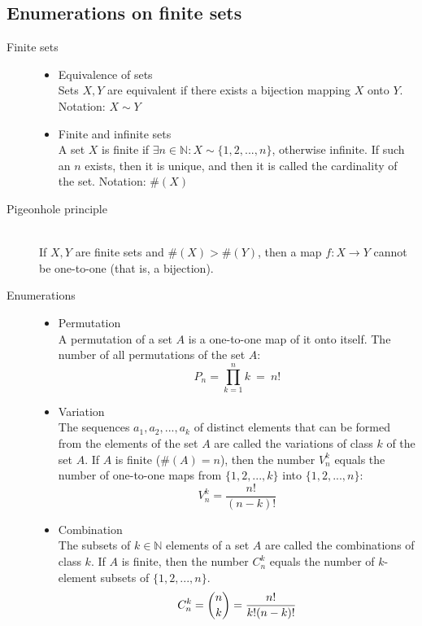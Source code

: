 \documentclass[margin=0px]{article}
\newcommand{\N}{\mathbb{N}}
\begin{document}
\subsection{Enumerations on finite sets}
\begin{description}
    \item[Finite sets] \hfill
        \begin{itemize}
            \item Equivalence of sets \\
                  Sets $X,Y$ are equivalent if there exists a bijection mapping $X$ onto $Y$.\\
                  Notation: $X \sim Y$
            \item Finite and infinite sets \\
                  A set $X$ is finite if $\exists n\in\N : X \sim \{1,2,...,n\}$, otherwise infinite. If such an $n$ exists, then it is unique, and then it is called the cardinality of the set. Notation: $ \#(X)$
        \end{itemize}
    \item[Pigeonhole principle] \hfill \\
        If $X,Y$ are finite sets and $\#(X) > \#(Y)$, then a map $f:X\rightarrow Y$ cannot be one-to-one (that is, a bijection).
    \item[Enumerations] \hfill
        \begin{itemize}
            \item Permutation \\
                  A permutation of a set $A$ is a one-to-one map of it onto itself. The number of all permutations of the set $A$:
                  \[P_n = \prod\limits_{k=1}^{n} k \ = \ n!\]
            \item Variation \\
                  The sequences $a_1,a_2,...,a_k$ of distinct elements that can be formed from the elements of the set $A$ are called the variations of class $k$ of the set $A$. If $A$ is finite ($\#(A) = n$), then the number $V_n^k$ equals the number of one-to-one maps from $\{1,2,...,k\}$ into $\{1,2,...,n\}$:
                  \[ V_n^k = \frac{n!}{(n-k)!}\]
            \item Combination \\
                  The subsets of $k\in\N$ elements of a set $A$ are called the combinations of class $k$. If $A$ is finite, then the number $C_n^k$ equals the number of $k$-element subsets of $\{1,2,...,n\}$.
                  \[C_n^k = \dbinom{n}{k} = \frac{n!}{k!(n-k)!}\]

\end{itemize}
\end{description}
\end{document}
